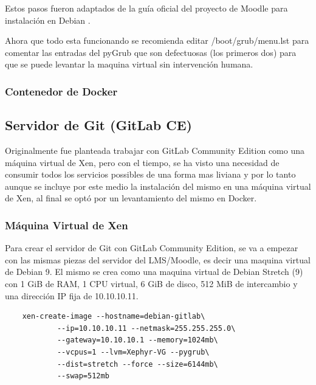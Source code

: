 Estos pasos fueron adaptados de la guía oficial del proyecto de Moodle para instalación en Debian \citep{MOODLE-Install-Debian}.

Ahora que todo esta funcionando se recomienda editar /boot/grub/menu.lst para comentar las entradas del pyGrub que son defectuosas (los primeros dos) para que se puede levantar la maquina virtual sin intervención humana.

\subsubsection{Contenedor de Docker}

 
\subsection{Servidor de Git (GitLab CE)}
Originalmente fue planteada trabajar con GitLab Community Edition como una máquina virtual de Xen, pero con el tiempo, se ha visto una necesidad de consumir todos los servicios possibles de una forma mas liviana y por lo tanto aunque se incluye por este medio la instalación del mismo en una máquina virtual de Xen, al final se optó por un levantamiento del mismo en Docker.

\subsubsection{Máquina Virtual de Xen}
Para crear el servidor de Git con GitLab Community Edition, se va a empezar con las mismas piezas del servidor del LMS/Moodle, es decir una maquina virtual de Debian 9. El mismo se crea como una maquina virtual de Debian Stretch (9) con 1 GiB de RAM, 1 CPU virtual, 6 GiB de disco, 512 MiB de intercambio y una dirección IP fija de 10.10.10.11.
\begin{lstlisting}
	xen-create-image --hostname=debian-gitlab\
    		--ip=10.10.10.11 --netmask=255.255.255.0\
        	--gateway=10.10.10.1 --memory=1024mb\
        	--vcpus=1 --lvm=Xephyr-VG --pygrub\
        	--dist=stretch --force --size=6144mb\
        	--swap=512mb
\end{lstlisting}

